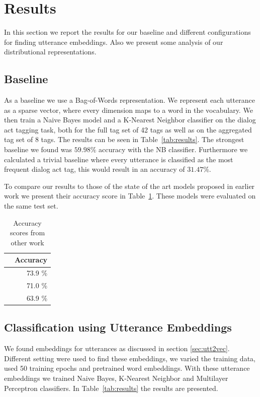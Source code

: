 \section{Results}\label{sec:results}
In this section we report the results for our baseline and different configurations for finding utterance embeddings.
Also we present some analysis of our distributional representations.

\subsection{Baseline}
As a baseline we use a Bag-of-Words representation.
We represent each utterance as a sparse vector, where every dimension maps to a word in the vocabulary.
We then train a Naive Bayes model and a K-Nearest Neighbor classifier on the dialog act tagging task, both for the full tag set of 42 tags as well as on the aggregated tag set of 8 tags.
The results can be seen in Table~\ref{tab:results}. The strongest baseline we found was $59.98\%$ accuracy with the NB classifier.
Furthermore we calculated a trivial baseline where every utterance is classified as the most frequent dialog act tag, this would result in an accuracy of $31.47\%$.

To compare our results to those of the state of the art models proposed in earlier work we present their accuracy score in Table~\ref{tab:sota}. These models were evaluated on the same test set.
\begin{table}[t]
	\centering
	\begin{tabular}{l|r}
		& \textbf{Accuracy} \\ \hline
		\newcite{kalchbrenner} & 73.9 \%           \\
		\newcite{stolcke2000}  & 71.0 \%           \\
		\newcite{milajevs}     & 63.9 \%          
	\end{tabular}
		\caption{Accuracy scores from other work}
		\label{tab:sota}
\end{table}

\subsection{Classification using Utterance Embeddings}
We found embeddings for utterances as discussed in section \ref{sec:utt2vec}.
Different setting were used to find these embeddings, we varied the training data, used 50 training epochs and pretrained word embeddings.
With these utterance embeddings we trained Naive Bayes, K-Nearest Neighbor and Multilayer Perceptron classifiers.
In Table~\ref{tab:results} the results are presented.

